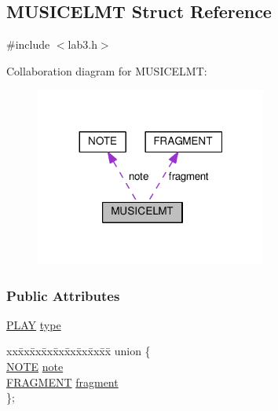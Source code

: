 \hypertarget{structMUSICELMT}{\subsection{M\+U\+S\+I\+C\+E\+L\+M\+T Struct Reference}
\label{structMUSICELMT}
}


{\ttfamily \#include $<$lab3.\+h$>$}



Collaboration diagram for M\+U\+S\+I\+C\+E\+L\+M\+T\+:\nopagebreak
\begin{figure}[H]
\begin{center}
\leavevmode
\includegraphics[width=215pt]{structMUSICELMT__coll__graph}
\end{center}
\end{figure}
\subsubsection*{Public Attributes}
\begin{DoxyCompactItemize}
\item 
\hyperlink{lab3_8h_a41c816c739b4ab01c73879f01ae63880}{P\+L\+A\+Y} \hyperlink{structMUSICELMT_aa9a541d279b1a98b190c1968217ad37f}{type}
\item 
\begin{tabbing}
xx\=xx\=xx\=xx\=xx\=xx\=xx\=xx\=xx\=\kill
union \{\\
\>\hyperlink{structNOTE}{NOTE} \hyperlink{structMUSICELMT_a662fdb18330107012ed8902725b08e5c}{note}\\
\>\hyperlink{structFRAGMENT}{FRAGMENT} \hyperlink{structMUSICELMT_ae418bce8087e7510ad8563a87b4c1c63}{fragment}\\
\}; \\

\end{tabbing}\end{DoxyCompactItemize}



